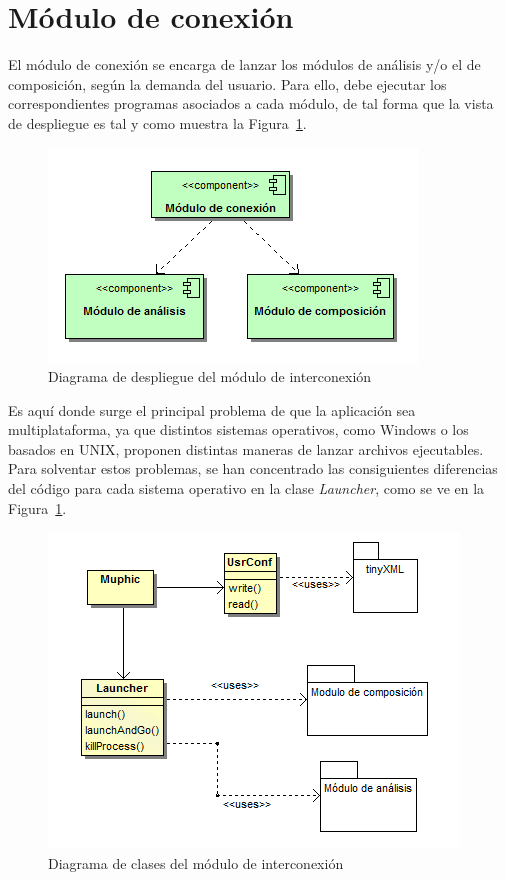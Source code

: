 \section{Módulo de conexión}

El módulo de conexión se encarga de lanzar los módulos de análisis y/o el de composición, según la demanda del usuario. Para ello, debe ejecutar los correspondientes programas asociados a cada módulo, de tal forma que la vista de despliegue es tal y como muestra la Figura~\ref{fig:muphic-deploy-diagram}.\\


		\begin{figure}[!htbp]
		\centering
		\includegraphics[scale=0.6]{graphics/muphic-deploy-diagram.png}
		\caption{Diagrama de despliegue del módulo de interconexión}
		\label{fig:muphic-deploy-diagram}
		\end{figure}
		
Es aquí donde surge el principal problema de que la aplicación sea multiplataforma, ya que distintos sistemas operativos, como Windows o los basados en UNIX, proponen distintas maneras de lanzar archivos ejecutables. Para solventar estos problemas, se han concentrado las consiguientes diferencias del código para cada sistema operativo en la clase \emph{Launcher}, como se ve en la Figura~\ref{}.\\

		\begin{figure}[!htbp]
		\centering
		\includegraphics[scale=0.6]{graphics/muphic-class-diagram.png}
		\caption{Diagrama de clases del módulo de interconexión}
		\label{fig:muphic-class-diagram}
		\end{figure}
		
